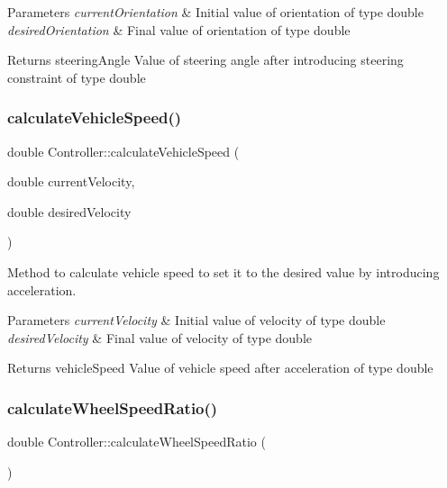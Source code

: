 \begin{DoxyParams}{Parameters}
{\em current\+Orientation} & Initial value of orientation of type double \\
\hline
{\em desired\+Orientation} & Final value of orientation of type double \\
\hline
\end{DoxyParams}
\begin{DoxyReturn}{Returns}
steering\+Angle Value of steering angle after introducing steering constraint of type double 
\end{DoxyReturn}
\mbox{\label{classController_a4c6ff34160fced40226456f39b97804f}} 
\subsubsection{\texorpdfstring{calculate\+Vehicle\+Speed()}{calculateVehicleSpeed()}}
{\footnotesize\ttfamily double Controller\+::calculate\+Vehicle\+Speed (\begin{DoxyParamCaption}\item[{double}]{current\+Velocity,  }\item[{double}]{desired\+Velocity }\end{DoxyParamCaption})}



Method to calculate vehicle speed to set it to the desired value by introducing acceleration. 


\begin{DoxyParams}{Parameters}
{\em current\+Velocity} & Initial value of velocity of type double \\
\hline
{\em desired\+Velocity} & Final value of velocity of type double \\
\hline
\end{DoxyParams}
\begin{DoxyReturn}{Returns}
vehicle\+Speed Value of vehicle speed after acceleration of type double 
\end{DoxyReturn}
\mbox{\label{classController_a2505ab26434dd301abbcb32ba4f75f0a}} 
\subsubsection{\texorpdfstring{calculate\+Wheel\+Speed\+Ratio()}{calculateWheelSpeedRatio()}}
{\footnotesize\ttfamily double Controller\+::calculate\+Wheel\+Speed\+Ratio (\begin{DoxyParamCaption}{ }\end{DoxyParamCaption})}



